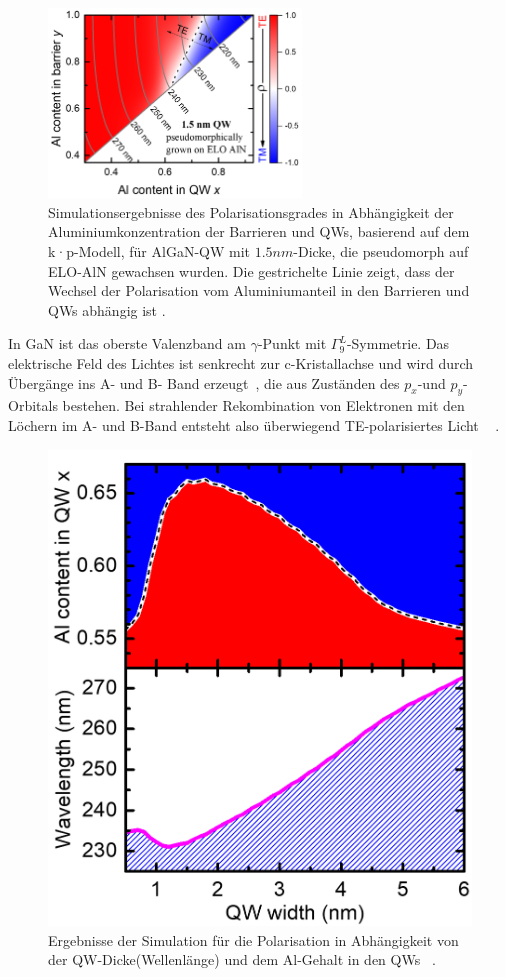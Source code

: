 \begin{figure}[htb]
  \centering
  \begin{minipage}{\linewidth}
      \centering
        \includegraphics[width=0.6\textwidth]{Bilder/christophPolarisationSimu.png}
      \caption{Simulationsergebnisse des Polarisationsgrades in Abhängigkeit der Aluminiumkonzentration der Barrieren und QWs, basierend auf
dem k·p-Modell, für AlGaN-QW mit $1.5nm$-Dicke, die pseudomorph auf ELO-AlN gewachsen wurden. Die gestrichelte Linie zeigt, dass der Wechsel der Polarisation vom Aluminiumanteil in den Barrieren und QWs abhängig ist \cite{doi:10.1063/1.4932651}.}
      \label{fig:simuchr}
  \end{minipage}
\end{figure}
\noindent
In GaN ist das oberste Valenzband am $\gamma$-Punkt mit $\Gamma^{L}_{9}$-Symmetrie. Das elektrische Feld des Lichtes ist senkrecht zur c-Kristallachse und wird durch Übergänge ins A- und B- Band erzeugt~\cite{doi:10.1063/1.3574025}, die aus Zuständen des $p_x$-und $p_y$-Orbitals bestehen. Bei strahlender Rekombination von Elektronen mit den Löchern im A- und B-Band entsteht also überwiegend TE-polarisiertes Licht ~\cite{doi:10.1063/1.3574025} . 
%
\begin{figure}[ht!]
  \centering
  \begin{minipage}{\linewidth}
      \centering
      \includegraphics[width=0.6\linewidth]{Bilder/christophPolarisationSimu1.png}
      \caption{Ergebnisse der Simulation für die Polarisation in Abhängigkeit von der QW-Dicke(Wellenlänge) und dem Al-Gehalt in den QWs ~\cite{doi:10.1063/1.4932651}.}
      \label{fig:simu1chr}
  \end{minipage}
\end{figure}
